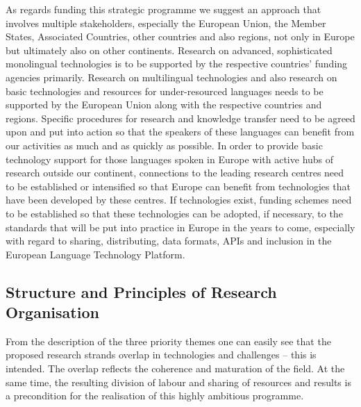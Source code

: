 \documentclass[10pt, plain]{../../metanetpaper}
\begin{document}
\begin{multicols}{2}
As regards funding this strategic programme we suggest an approach that involves multiple stakeholders, especially the European Union, the Member States, Associated Countries, other countries and also regions, not only in Europe but ultimately also on other continents. Research on advanced, sophisticated monolingual technologies is to be supported by the respective countries' funding agencies primarily. Research on multilingual technologies and also research on basic technologies and resources for under-resourced languages needs to be supported by the European Union along with the respective countries and regions. Specific procedures for research and knowledge transfer need to be agreed upon and put into action so that the speakers of these languages can benefit from our activities as much and as quickly as possible. In order to provide basic technology support for those languages spoken in Europe with active hubs of research outside our continent, connections to the leading research centres need to be established or intensified so that Europe can benefit from technologies that have been developed by these centres. If technologies exist, funding schemes need to be established so that these technologies can be adopted, if necessary, to the standards that will be put into practice in Europe in the years to come, especially with regard to sharing, distributing, data formats, APIs and inclusion in the European Language Technology Platform.

\subsection{Structure and Principles of Research Organisation}
\label{sec:struct-princ-research-org}

From the description of the three priority themes one can easily see that the proposed research strands overlap in technologies and challenges -- this is intended. The overlap reflects the coherence and maturation of the field. At the same time, the resulting division of labour and sharing of resources and results is a precondition for the realisation of this highly ambitious programme.


\end{multicols}
\end{document}
